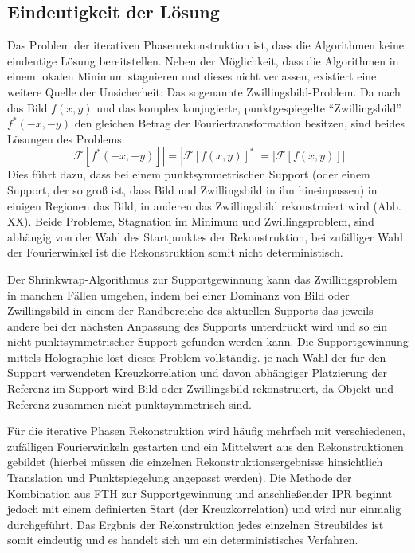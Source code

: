 \subsection{Eindeutigkeit der Lösung}
Das Problem der iterativen Phasenrekonstruktion ist, dass die Algorithmen keine eindeutige Lösung bereitstellen. Neben der Möglichkeit, dass die Algorithmen in einem lokalen Minimum stagnieren und dieses nicht verlassen, existiert eine weitere Quelle der Unsicherheit: Das sogenannte Zwillingsbild-Problem. Da nach  das Bild $f(x,y)$ und das komplex konjugierte, punktgespiegelte "`Zwillingsbild"'  $f^*(-x,-y)$ den gleichen Betrag der Fouriertransformation besitzen, sind beides Lösungen des Problems.
\begin{equation}
	\label{eq:zwilling}
	\left|\mathscr{F}[f^*(-x,-y)]\right|=\left|\mathscr{F}[f(x,y)]^*\right|=\left|\mathscr{F}[f(x,y)]\right|
\end{equation}
Dies führt dazu, dass bei einem punktsymmetrischen Support (oder einem Support, der so groß ist, dass Bild und Zwillingsbild in ihn hineinpassen) in einigen Regionen das Bild, in anderen das Zwillingsbild rekonstruiert wird (Abb. XX). Beide Probleme, Stagnation im Minimum und Zwillingsproblem, sind abhängig von der Wahl des Startpunktes der Rekonstruktion, bei zufälliger Wahl der Fourierwinkel ist die Rekonstruktion somit nicht deterministisch.

Der Shrinkwrap-Algorithmus zur Supportgewinnung kann das Zwillingsproblem in manchen Fällen umgehen, indem bei einer Dominanz von Bild oder Zwillingsbild in einem der Randbereiche des aktuellen Supports das jeweils andere bei der nächsten Anpassung des Supports unterdrückt wird und so ein nicht-punktsymmetrischer Support gefunden werden kann.
Die Supportgewinnung mittels Holographie löst dieses Problem vollständig. je nach Wahl der für den Support verwendeten Kreuzkorrelation und davon abhängiger Platzierung der Referenz im Support wird Bild oder Zwillingsbild rekonstruiert, da Objekt und Referenz zusammen nicht punktsymmetrisch sind.

Für die iterative Phasen Rekonstruktion wird häufig mehrfach mit verschiedenen, zufälligen Fourierwinkeln gestarten und ein Mittelwert aus den Rekonstruktionen gebildet (hierbei müssen die einzelnen Rekonstruktionsergebnisse hinsichtlich Translation und Punktspiegelung angepasst werden). Die Methode der Kombination aus FTH zur Supportgewinnung und anschließender IPR beginnt jedoch mit einem definierten Start (der Kreuzkorrelation) und wird nur einmalig durchgeführt. Das Ergbnis der Rekonstruktion jedes einzelnen Streubildes ist somit eindeutig und es handelt sich um ein deterministisches Verfahren.

